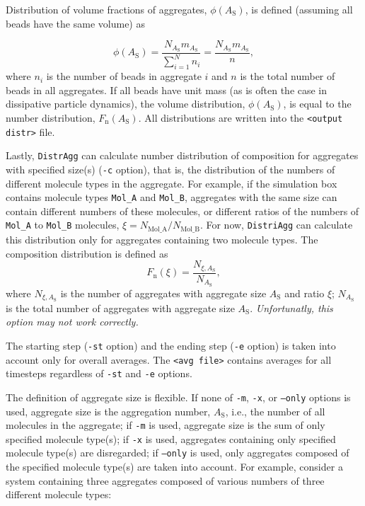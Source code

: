 Distribution of volume fractions of aggregates, $\phi(A_{\mathrm{S}})$, is
defined (assuming all beads have the same volume) as

\begin{equation} \label{eq:Fvol}
  \phi(A_{\mathrm{S}}) = \frac{N_{A_{\mathrm{S}} } m_{A_{\mathrm{S}} }}{\sum_{i=1}^N n_i} =
  \frac{N_{A_{\mathrm{S}} } m_{A_{\mathrm{S}} }}{n},
\end{equation}
where $n_i$ is the number of beads in aggregate $i$ and $n$ is the total
number of beads in all aggregates. If all beads have unit mass (as is often
the case in dissipative particle dynamics), the volume distribution,
$\phi(A_{\mathrm{S}})$, is equal to the number distribution,
$F_{\mathrm{n}}(A_{\mathrm{S}})$.
All distributions are written into the \texttt{<output distr>} file.

Lastly, \texttt{DistrAgg} can calculate number distribution of composition
for aggregates with specified size(s) (\texttt{-c} option), that is, the
distribution of the numbers of different molecule types in the aggregate.
For example, if the simulation box contains molecule types \texttt{Mol\_A}
and \texttt{Mol\_B}, aggregates with the same size can contain different
numbers of these molecules, or different ratios of the numbers of
\texttt{Mol\_A} to \texttt{Mol\_B} molecules,
$\xi=N_{\mathrm{Mol\_A}}/N_{\mathrm{Mol\_B}}$. For now, \texttt{DistriAgg}
can calculate this distribution only for aggregates containing two molecule
types. The composition distribution is defined as
\begin{equation} \label{eq:CompDistr}
  F_{\mathrm{n}}(\xi) = \frac{N_{\xi,A_{\mathrm{S}} }}{N_{A_{\mathrm{S}}} },
\end{equation}
where $N_{\xi,A_{\mathrm{S}} }$ is the number of aggregates with aggregate
size $A_{\mathrm{S}}$ and ratio $\xi$; $N_{A_{\mathrm{S}}}$ is the total
number of aggregates with aggregate size $A_{\mathrm{S}}$.
\textit{Unfortunatly, this option may not work correctly.}

The starting step (\texttt{-st} option) and the ending step (\texttt{-e}
option) is taken into account only for overall averages. The \texttt{<avg
file>} contains averages for all timesteps regardless of \texttt{-st} and
\texttt{-e} options.

The definition of aggregate size is flexible. If none of \texttt{-m},
\texttt{-x}, or \texttt{--only} options is used, aggregate size is the
 aggregation number, $A_{\mathrm{S}}$, i.e., the number of all
molecules in the aggregate; if \texttt{-m} is used, aggregate size is the
sum of only specified molecule type(s); if \texttt{-x} is used, aggregates
containing only specified molecule type(s) are disregarded; if
\texttt{--only} is used, only aggregates composed of the specified molecule
type(s) are taken into account. For example, consider a system containing
three aggregates composed of various numbers of three different molecule
types:


